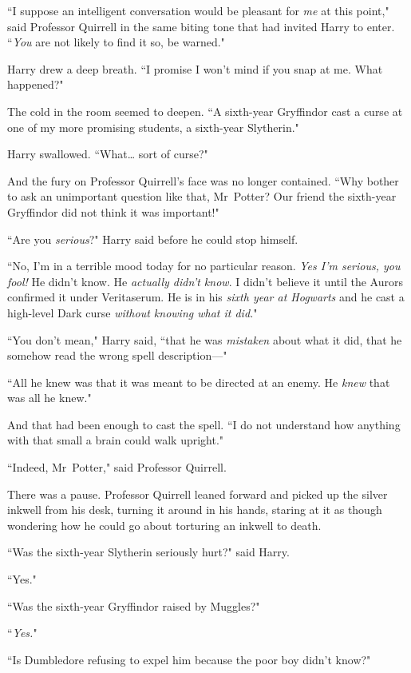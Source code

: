 ``I suppose an intelligent conversation would be pleasant for \emph{me} at this point," said Professor Quirrell in the same biting tone that had invited Harry to enter. ``\emph{You} are not likely to find it so, be warned."

Harry drew a deep breath. ``I promise I won't mind if you snap at me. What happened?"

The cold in the room seemed to deepen. ``A sixth-year Gryffindor cast a curse at one of my more promising students, a sixth-year Slytherin."

Harry swallowed. ``What{\ldots} sort of curse?"

And the fury on Professor Quirrell's face was no longer contained. ``Why bother to ask an unimportant question like that, Mr~Potter? Our friend the sixth-year Gryffindor did not think it was important!"

``Are you \emph{serious}?" Harry said before he could stop himself.

``No, I'm in a terrible mood today for no particular reason. \emph{Yes I'm serious, you fool!} He didn't know. He \emph{actually didn't know}. I didn't believe it until the Aurors confirmed it under Veritaserum. He is in his \emph{sixth year at Hogwarts} and he cast a high-level Dark curse \emph{without knowing what it did.}"

``You don't mean," Harry said, ``that he was \emph{mistaken} about what it did, that he somehow read the wrong spell description—"

``All he knew was that it was meant to be directed at an enemy. He \emph{knew} that was all he knew."

And that had been enough to cast the spell. ``I do not understand how anything with that small a brain could walk upright."

``Indeed, Mr~Potter," said Professor Quirrell.

There was a pause. Professor Quirrell leaned forward and picked up the silver inkwell from his desk, turning it around in his hands, staring at it as though wondering how he could go about torturing an inkwell to death.

``Was the sixth-year Slytherin seriously hurt?" said Harry.

``Yes."

``Was the sixth-year Gryffindor raised by Muggles?"

``\emph{Yes.}"

``Is Dumbledore refusing to expel him because the poor boy didn't know?"

